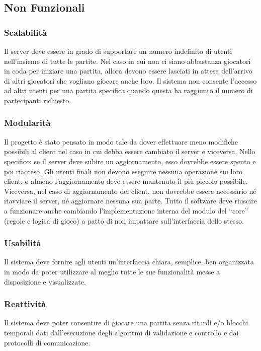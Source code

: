 \subsection{Non Funzionali}

\subsubsection{Scalabilità}
Il server deve essere in grado di supportare un numero indefinito di utenti nell’insieme di tutte le partite.
Nel caso in cui non ci siano abbastanza giocatori in coda per iniziare una partita, allora devono essere lasciati in attesa dell’arrivo di altri giocatori che vogliano giocare anche loro.
Il sistema non consente l’accesso ad altri utenti per una partita specifica quando questa ha raggiunto il numero di partecipanti richiesto.

\subsubsection{Modularità}
Il progetto è stato pensato in modo tale da dover effettuare meno modifiche possibili al client nel caso in cui debba essere cambiato il server e viceversa.
Nello specifico: se il server deve subire un aggiornamento, esso dovrebbe essere spento e poi riacceso.
Gli utenti finali non devono eseguire nessuna operazione sui loro client, o almeno l’aggiornamento deve essere mantenuto il più piccolo possibile.
Viceversa, nel caso di aggiornamento dei client, non dovrebbe essere necessario né riavviare il server, né aggiornare nessuna sua parte.
Tutto il software deve riuscire a funzionare anche cambiando l’implementazione interna del modulo del “core” (regole e logica di gioco) a patto di non impattare sull’interfaccia dello stesso.

\subsubsection{Usabilità}
Il sistema deve fornire agli utenti un'interfaccia chiara, semplice, ben organizzata in modo da poter utilizzare al meglio tutte le sue funzionalità messe a disposizione e visualizzate.

\subsubsection{Reattività}
Il sistema deve poter consentire di giocare una partita senza ritardi e/o blocchi temporali dati dall’esecuzione degli algoritmi di validazione e controllo e dai protocolli di comunicazione.

